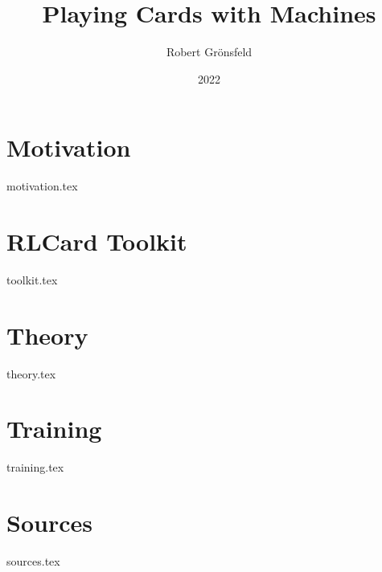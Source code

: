 \documentclass[aspectratio=169,table,svgnames]{beamer}
\title{Playing Cards with Machines}
\author{Robert Grönsfeld}
\institute{Baloise}
\date{2022}
\begin{document}
\frame{\titlepage}

\part{Motivation}
\frame{\partpage}
{motivation.tex}

\part{RLCard Toolkit}
\frame{\partpage}
{toolkit.tex}

\part{Theory}
\frame{\partpage}
{theory.tex}

\part{Training}
\frame{\partpage}
{training.tex}

\part{Sources}
\frame{\partpage}
{sources.tex}
\end{document}
